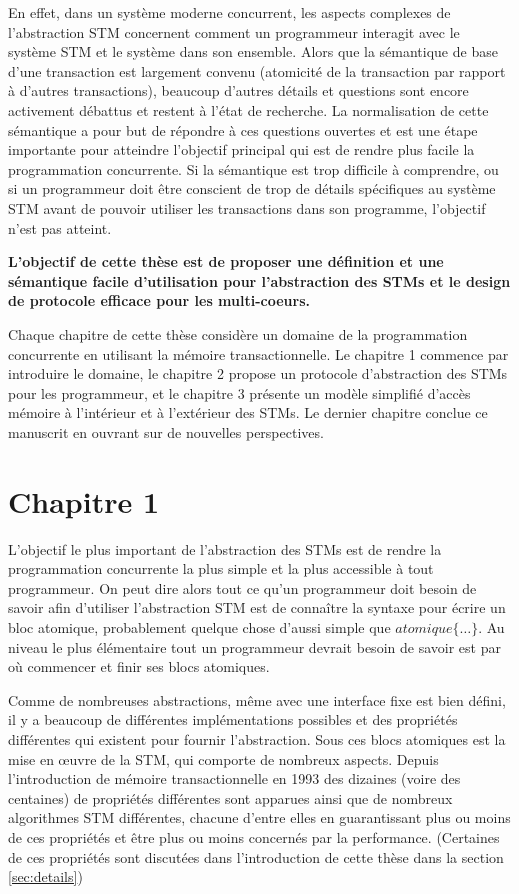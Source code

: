 En effet, dans un système moderne concurrent,  les aspects complexes de l'abstraction STM concernent comment un programmeur interagit avec le système STM et le système dans son ensemble.
Alors que la sémantique de base d'une transaction est largement convenu (atomicité de la transaction par rapport à d'autres transactions),
beaucoup d'autres détails et questions sont encore activement débattus et restent à l'état de recherche.
La normalisation de cette sémantique a pour but de répondre à ces questions ouvertes et est une étape importante pour atteindre l'objectif principal qui est de rendre plus facile la programmation concurrente.
Si la sémantique est trop difficile à comprendre, ou si un programmeur doit être conscient de trop de détails spécifiques au système
STM avant de pouvoir utiliser les transactions dans son programme, l'objectif n'est pas atteint.



\textbf{L'objectif de cette thèse est de proposer une définition et une sémantique facile d'utilisation pour l'abstraction des STMs et le design de protocole efficace pour les multi-coeurs.}


Chaque chapitre de cette thèse considère un domaine de la programmation concurrente 
en utilisant la mémoire transactionnelle. Le chapitre 1 commence par introduire le domaine,
le chapitre 2 propose un protocole d'abstraction des STMs pour les programmeur, et le chapitre 3 présente un modèle simplifié d'accès mémoire à l'intérieur et à l'extérieur des STMs.
Le dernier chapitre conclue ce manuscrit en ouvrant sur de nouvelles perspectives.



\section*{Chapitre 1}

L'objectif le plus important de l'abstraction des STMs est de rendre la programmation concurrente la plus simple et la plus accessible à tout programmeur.
On peut dire alors tout ce qu'un programmeur doit besoin de savoir afin d'utiliser l'abstraction STM est
de connaître la syntaxe pour écrire un bloc atomique, probablement quelque chose d'aussi simple que $atomique\{ \dots \}$.
Au niveau le plus élémentaire tout un programmeur devrait besoin de savoir est par où commencer et finir ses blocs atomiques.

Comme de nombreuses abstractions, même avec une interface fixe est bien défini,
il y a beaucoup de différentes implémentations possibles et des propriétés différentes qui existent pour fournir l'abstraction.
Sous ces blocs atomiques est la mise en œuvre de la STM, qui comporte de nombreux aspects.
Depuis l'introduction de mémoire transactionnelle en 1993 \cite{HM93} des dizaines (voire des centaines) de propriétés différentes
sont apparues ainsi que de nombreux algorithmes STM différentes, chacune d'entre elles en guarantissant plus ou moins de ces propriétés et être plus ou moins concernés par la performance.
(Certaines de ces propriétés sont discutées dans l'introduction de cette thèse dans la section \ref{sec:details})


